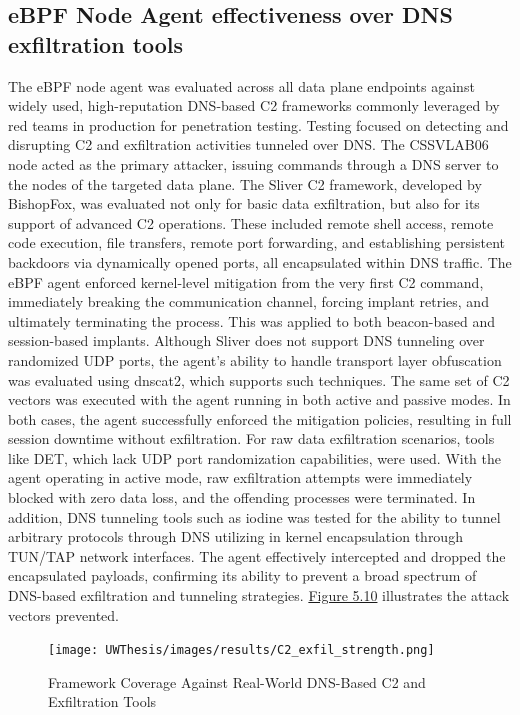 \documentclass [11pt, proquest] {uwthesis}[2020/02/24]
\begin{document}
\subsection{eBPF Node Agent effectiveness over DNS exfiltration tools}
The eBPF node agent was evaluated across all data plane endpoints against widely used, high-reputation DNS-based C2 frameworks commonly leveraged by red teams in production for penetration testing. Testing focused on detecting and disrupting C2 and exfiltration activities tunneled over DNS. The CSSVLAB06 node acted as the primary attacker, issuing commands through a DNS server to the nodes of the targeted data plane.
The Sliver C2 framework, developed by BishopFox, was evaluated not only for basic data exfiltration, but also for its support of advanced C2 operations. These included remote shell access, remote code execution, file transfers, remote port forwarding, and establishing persistent backdoors via dynamically opened ports, all encapsulated within DNS traffic. The eBPF agent enforced kernel-level mitigation from the very first C2 command, immediately breaking the communication channel, forcing implant retries, and ultimately terminating the process. This was applied to both beacon-based and session-based implants.
Although Sliver does not support DNS tunneling over randomized UDP ports, the agent’s ability to handle transport layer obfuscation was evaluated using dnscat2, which supports such techniques. The same set of C2 vectors was executed with the agent running in both active and passive modes. In both cases, the agent successfully enforced the mitigation policies, resulting in full session downtime without exfiltration.
For raw data exfiltration scenarios, tools like DET, which lack UDP port randomization capabilities, were used. With the agent operating in active mode, raw exfiltration attempts were immediately blocked with zero data loss, and the offending processes were terminated. In addition, DNS tunneling tools such as iodine was tested for the ability to tunnel arbitrary protocols through DNS utilizing in kernel encapsulation through TUN/TAP network interfaces. The agent effectively intercepted and dropped the encapsulated payloads, confirming its ability to prevent a broad spectrum of DNS-based exfiltration and tunneling strategies. \hyperref[tab:dns-framework-coverage]{Figure 5.10} illustrates the  attack vectors prevented. 

\newpage
\begin{figure}[H]
  \texttt{[image: UWThesis/images/results/C2\_exfil\_strength.png]}
  \caption{Framework Coverage Against Real-World DNS-Based C2 and Exfiltration Tools}
\label{tab:dns-framework-coverage}
\end{figure}
\end{document}
